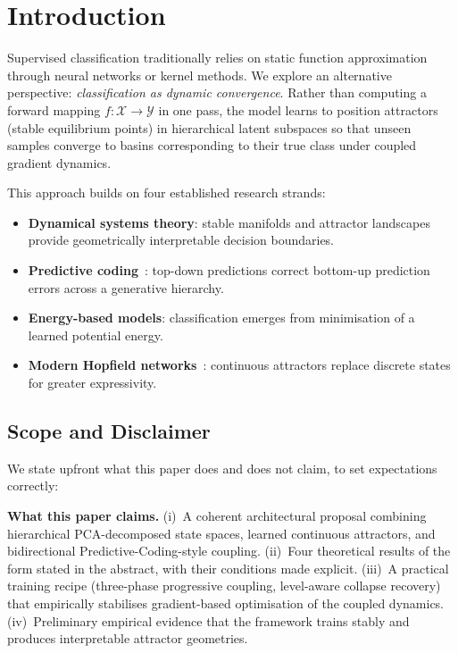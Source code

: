 \documentclass[11pt,a4paper]{article}
\begin{document}
\section{Introduction}

Supervised classification traditionally relies on static function approximation through
neural networks or kernel methods. We explore an alternative perspective:
\emph{classification as dynamic convergence}. Rather than computing a forward mapping
$f : \mathcal{X} \to \mathcal{Y}$ in one pass, the model learns to position attractors
(stable equilibrium points) in hierarchical latent subspaces so that unseen samples
converge to basins corresponding to their true class under coupled gradient dynamics.

This approach builds on four established research strands:
\begin{itemize}
  \item \textbf{Dynamical systems theory}: stable manifolds and attractor landscapes provide
        geometrically interpretable decision boundaries.
  \item \textbf{Predictive coding}~\cite{rao1999predictive,friston2005theory}: top-down
        predictions correct bottom-up prediction errors across a generative hierarchy.
  \item \textbf{Energy-based models}: classification emerges from minimisation of a learned
        potential energy.
  \item \textbf{Modern Hopfield networks}~\cite{ramsauer2021hopfield}: continuous attractors
        replace discrete states for greater expressivity.
\end{itemize}

\subsection{Scope and Disclaimer}

We state upfront what this paper does and does not claim, to set expectations correctly:

\textbf{What this paper claims.} (i)~A coherent architectural proposal combining
hierarchical PCA-decomposed state spaces, learned continuous attractors, and bidirectional
Predictive-Coding-style coupling. (ii)~Four theoretical results of the form stated in the
abstract, with their conditions made explicit. (iii)~A practical training recipe
(three-phase progressive coupling, level-aware collapse recovery) that empirically
stabilises gradient-based optimisation of the coupled dynamics. (iv)~Preliminary empirical
evidence that the framework trains stably and produces interpretable attractor geometries.
\end{document}
